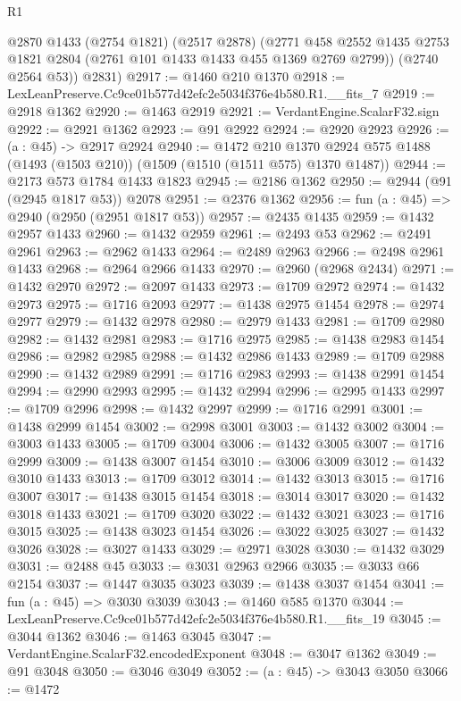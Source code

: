 \begin{lexlean}{R1}
\begin{coremodule}
        @2870
        @1433
        (@2754 @1821)
        (@2517 @2878)
        (@2771 @458 @2552 @1435 @2753 @1821 @2804 (@2761 @101 @1433 @1433 @455 @1369 @2769 @2799))
        (@2740 @2564 @53))
      @2831)
@2917 := @1460 @210 @1370
@2918 := LexLeanPreserve.Cc9ce01b577d42efc2e5034f376e4b580.R1.__fits_7
@2919 := @2918 @1362
@2920 := @1463 @2919
@2921 := VerdantEngine.ScalarF32.sign
@2922 := @2921 @1362
@2923 := @91 @2922
@2924 := @2920 @2923
@2926 := (a : @45) -> @2917 @2924
@2940 := @1472
    @210
    @1370
    @2924
    @575
    @1488
    (@1493 (@1503 @210))
    (@1509 (@1510 (@1511 @575) @1370 @1487))
@2944 := @2173 @573 @1784 @1433 @1823
@2945 := @2186 @1362
@2950 := @2944 (@91 (@2945 @1817 @53)) @2078
@2951 := @2376 @1362
@2956 := fun (a : @45) => @2940 (@2950 (@2951 @1817 @53))
@2957 := @2435 @1435
@2959 := @1432 @2957 @1433
@2960 := @1432 @2959
@2961 := @2493 @53
@2962 := @2491 @2961
@2963 := @2962 @1433
@2964 := @2489 @2963
@2966 := @2498 @2961 @1433
@2968 := @2964 @2966 @1433
@2970 := @2960 (@2968 @2434)
@2971 := @1432 @2970
@2972 := @2097 @1433
@2973 := @1709 @2972
@2974 := @1432 @2973
@2975 := @1716 @2093
@2977 := @1438 @2975 @1454
@2978 := @2974 @2977
@2979 := @1432 @2978
@2980 := @2979 @1433
@2981 := @1709 @2980
@2982 := @1432 @2981
@2983 := @1716 @2975
@2985 := @1438 @2983 @1454
@2986 := @2982 @2985
@2988 := @1432 @2986 @1433
@2989 := @1709 @2988
@2990 := @1432 @2989
@2991 := @1716 @2983
@2993 := @1438 @2991 @1454
@2994 := @2990 @2993
@2995 := @1432 @2994
@2996 := @2995 @1433
@2997 := @1709 @2996
@2998 := @1432 @2997
@2999 := @1716 @2991
@3001 := @1438 @2999 @1454
@3002 := @2998 @3001
@3003 := @1432 @3002
@3004 := @3003 @1433
@3005 := @1709 @3004
@3006 := @1432 @3005
@3007 := @1716 @2999
@3009 := @1438 @3007 @1454
@3010 := @3006 @3009
@3012 := @1432 @3010 @1433
@3013 := @1709 @3012
@3014 := @1432 @3013
@3015 := @1716 @3007
@3017 := @1438 @3015 @1454
@3018 := @3014 @3017
@3020 := @1432 @3018 @1433
@3021 := @1709 @3020
@3022 := @1432 @3021
@3023 := @1716 @3015
@3025 := @1438 @3023 @1454
@3026 := @3022 @3025
@3027 := @1432 @3026
@3028 := @3027 @1433
@3029 := @2971 @3028
@3030 := @1432 @3029
@3031 := @2488 @45
@3033 := @3031 @2963 @2966
@3035 := @3033 @66 @2154
@3037 := @1447 @3035 @3023
@3039 := @1438 @3037 @1454
@3041 := fun (a : @45) => @3030 @3039
@3043 := @1460 @585 @1370
@3044 := LexLeanPreserve.Cc9ce01b577d42efc2e5034f376e4b580.R1.__fits_19
@3045 := @3044 @1362
@3046 := @1463 @3045
@3047 := VerdantEngine.ScalarF32.encodedExponent
@3048 := @3047 @1362
@3049 := @91 @3048
@3050 := @3046 @3049
@3052 := (a : @45) -> @3043 @3050
@3066 := @1472

\end{coremodule}
\end{lexlean}
